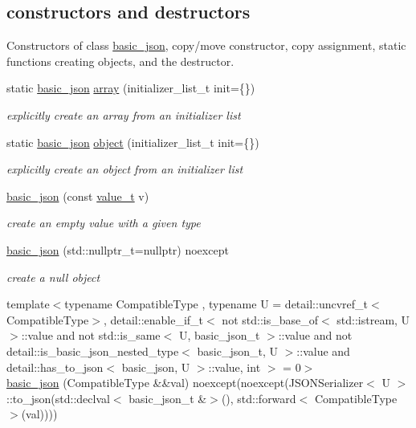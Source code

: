 \subsection*{constructors and destructors}
\label{_amgrpd94b4d3d0135946bb7bdf25e48755337}%
Constructors of class \mbox{\hyperlink{classnlohmann_1_1basic__json}{basic\+\_\+json}}, copy/move constructor, copy assignment, static functions creating objects, and the destructor. \begin{DoxyCompactItemize}
\item 
static \mbox{\hyperlink{classnlohmann_1_1basic__json}{basic\+\_\+json}} \mbox{\hyperlink{classnlohmann_1_1basic__json_aa80485befaffcadaa39965494e0b4d2e}{array}} (initializer\+\_\+list\+\_\+t init=\{\})
\begin{DoxyCompactList}\small\item\em explicitly create an array from an initializer list \end{DoxyCompactList}\item 
static \mbox{\hyperlink{classnlohmann_1_1basic__json}{basic\+\_\+json}} \mbox{\hyperlink{classnlohmann_1_1basic__json_aa13f7c0615867542ce80337cbcf13ada}{object}} (initializer\+\_\+list\+\_\+t init=\{\})
\begin{DoxyCompactList}\small\item\em explicitly create an object from an initializer list \end{DoxyCompactList}\item 
\mbox{\hyperlink{classnlohmann_1_1basic__json_aed115142bd0c6c66c864700e0467df55}{basic\+\_\+json}} (const \mbox{\hyperlink{namespacenlohmann_1_1detail_a90aa5ef615aa8305e9ea20d8a947980f}{value\+\_\+t}} v)
\begin{DoxyCompactList}\small\item\em create an empty value with a given type \end{DoxyCompactList}\item 
\mbox{\hyperlink{classnlohmann_1_1basic__json_ae9be9e956bfc4658f35d17c6aa72b063}{basic\+\_\+json}} (std\+::nullptr\+\_\+t=nullptr) noexcept
\begin{DoxyCompactList}\small\item\em create a null object \end{DoxyCompactList}\item 
{\footnotesize template$<$typename Compatible\+Type , typename U  = detail\+::uncvref\+\_\+t$<$\+Compatible\+Type$>$, detail\+::enable\+\_\+if\+\_\+t$<$ not std\+::is\+\_\+base\+\_\+of$<$ std\+::istream, U $>$\+::value and not std\+::is\+\_\+same$<$ U, basic\+\_\+json\+\_\+t $>$\+::value and not detail\+::is\+\_\+basic\+\_\+json\+\_\+nested\+\_\+type$<$ basic\+\_\+json\+\_\+t, U $>$\+::value and detail\+::has\+\_\+to\+\_\+json$<$ basic\+\_\+json, U $>$\+::value, int $>$  = 0$>$ }\\\mbox{\hyperlink{classnlohmann_1_1basic__json_a5a6558bfd1be139a638f91f0e09fc737}{basic\+\_\+json}} (Compatible\+Type \&\&val) noexcept(noexcept(J\+S\+O\+N\+Serializer$<$ U $>$\+::to\+\_\+json(std\+::declval$<$ basic\+\_\+json\+\_\+t \&$>$(), std\+::forward$<$ Compatible\+Type $>$(val))))

\end{DoxyCompactItemize}
